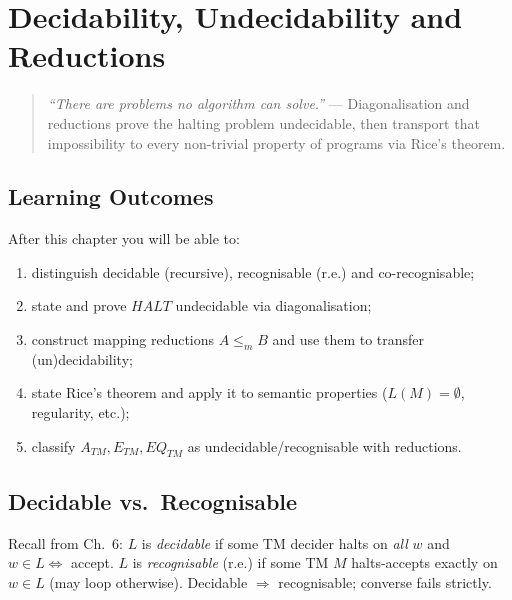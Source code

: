 \chapter{Decidability, Undecidability and Reductions}
\label{ch:decidability}

\begin{quote}
\emph{``There are problems no algorithm can solve.''} --- Diagonalisation and reductions prove the halting problem undecidable, then transport that impossibility to every non-trivial property of programs via Rice's theorem.
\end{quote}

\noindent{}
\vspace{0.4em}

\section*{Learning Outcomes}
After this chapter you will be able to:
\begin{enumerate}[label=(L\arabic*)]
    \item distinguish decidable (recursive), recognisable (r.e.) and co-recognisable;
    \item state and prove $HALT$ undecidable via diagonalisation;
    \item construct mapping reductions $A\le_m B$ and use them to transfer (un)decidability;
    \item state Rice's theorem and apply it to semantic properties ($L(M)=\emptyset$, regularity, etc.);
    \item classify $A_{TM},E_{TM},EQ_{TM}$ as undecidable/recognisable with reductions.
\end{enumerate}

\section{Decidable vs.\ Recognisable}
\label{sec:decidable-def}
Recall from Ch.~6: $L$ is \emph{decidable} if some TM decider halts on \emph{all} $w$ and $w\in L\iff$ accept. $L$ is \emph{recognisable} (r.e.) if some TM $M$ halts-accepts exactly on $w\in L$ (may loop otherwise). Decidable $\Rightarrow$ recognisable; converse fails strictly.

